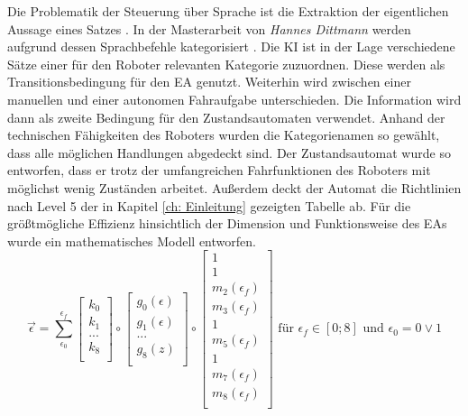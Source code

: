 	Die Problematik der Steuerung über Sprache ist die Extraktion der eigentlichen Aussage eines Satzes \cite{Dittmann}. In der Masterarbeit von \textit{Hannes Dittmann} werden aufgrund dessen Sprachbefehle kategorisiert \cite{Dittmann}. Die KI ist in der Lage verschiedene Sätze einer für den Roboter relevanten Kategorie zuzuordnen. Diese werden als Transitionsbedingung für den EA genutzt. Weiterhin wird zwischen einer manuellen und einer autonomen Fahraufgabe unterschieden. Die Information wird dann als zweite Bedingung für den Zustandsautomaten verwendet. Anhand der technischen Fähigkeiten des Roboters wurden die Kategorienamen so gewählt, dass alle möglichen Handlungen abgedeckt sind. Der Zustandsautomat wurde so entworfen, dass er trotz der umfangreichen Fahrfunktionen des Roboters mit möglichst wenig Zuständen arbeitet. Außerdem deckt der Automat die Richtlinien nach Level 5 der in Kapitel \ref{ch: Einleitung} gezeigten Tabelle ab. Für die größtmögliche Effizienz hinsichtlich der Dimension und Funktionsweise des EAs wurde ein mathematisches Modell entworfen.\\
	
	\begin{equation}
	\vec{\epsilon}=\sum_{\epsilon_0}^{\epsilon_f} \left[ \begin{array}{r}
	k_0  \\
	k_{1}  \\
	...  \\
	k_8  \\
	\end{array}\right] \circ
	\left[ \begin{array}{r}
	g_0(\epsilon)  \\
	g_{1}(\epsilon)  \\
	...  \\
	g_8(z)  \\
	\end{array}\right]  \circ
	\left[ \begin{array}{r}
	1  \\
	1  \\
	m_{2}(\epsilon_f)  \\
	m_{3}(\epsilon_f)   \\
	1  \\
	m_{5}(\epsilon_f)  \\
	1   \\
	m_{7}(\epsilon_f)   \\
	m_8(\epsilon_f)  \\
	\end{array}\right]
	\text{ für }\epsilon_f\in[0;8] \text{ und }\epsilon_0=0 \vee 1
	\label{eq: statemachine}
	\end{equation}\\
	
